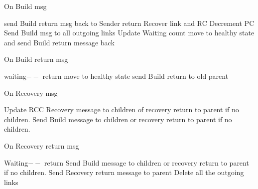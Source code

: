 \documentclass{article}
\begin{document}
	
\begin{algorithm}
\caption{On Build msg}
\label{Build message received}
\begin{algorithmic}[1]
\State send Build return msg back to Sender
\State return
\EndIf
\State Recover link and RC
\State Decrement PC
\State Send Build msg to all outgoing links
\State Update Waiting count
\State move to healthy state and send Build return message back
\EndIf
\EndProcedure
\end{algorithmic}
\end{algorithm}	



\begin{algorithm}
\caption{On Build return msg}
\label{Build return message received}
\begin{algorithmic}[1]
\State waiting$--$
\State return
\EndIf
\State move to healthy state
\State send Build return to old parent
\EndIf
\EndProcedure
\end{algorithmic}
\end{algorithm}	


\begin{algorithm}
\caption{On Recovery msg}
\label{Recovery message received}
\begin{algorithmic}[1]
\State Update RCC
\State Recovery message to children of recovery return to parent if no children.
\EndIf
{} 
\State Send Build message to children or recovery return to parent if no children.
\EndIf
\EndProcedure
\end{algorithmic}
\end{algorithm}	


\begin{algorithm}
\caption{On Recovery return msg}
\label{Recovery return message received}
\begin{algorithmic}[1]
\State Waiting$--$
\State return
\EndIf
{}
\State Send Build message to children or recovery return to parent if no children.
\State Send Recovery return message to parent
\State Delete all the outgoing links
\EndIf
\EndProcedure
\end{algorithmic}
\end{algorithm}	
\end{document}
